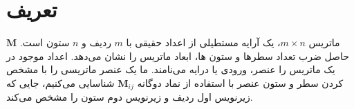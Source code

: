 \setcounter{figure}{0}
\renewcommand{\thefigure}{\arabic{figure}.\arabic{chapter}}


\section{\textbf{تعریف}}
\label{sec:2.1}
{
    \Large
    \begin{spacing}{1.5}
        $\textbf{M}$ ماتریس $m\times n$، یک آرایه مستطیلی از اعداد حقیقی با $m$ ردیف و $n$ ستون است.
        حاصل ضرب تعداد سطرها و ستون ها، ابعاد ماتریس را نشان می‌دهد.
        اعداد موجود در یک ماتریس را عنصر، ورودی یا درایه می‌نامند.
        ما یک عنصر ماتریسی را با مشخص کردن سطر و ستون عنصر با استفاده از نماد دوگانه $\textbf{M}_{ij}$ شناسایی می‌کنیم،
        جایی که زیرنویس اول ردیف و زیرنویس دوم ستون را مشخص می‌کند.


\end{spacing}}
